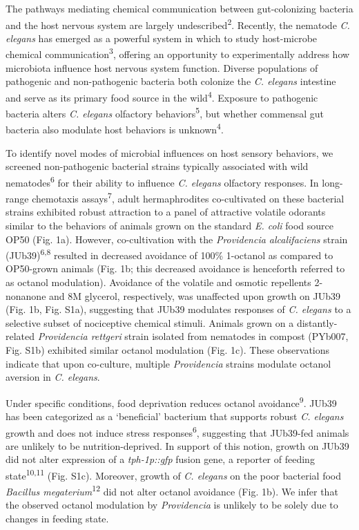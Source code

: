 \documentclass[11pt,]{article}
\begin{document}
The pathways mediating chemical communication between gut-colonizing
bacteria and the host nervous system are largely
undescribed\textsuperscript{2}. Recently, the nematode
\textit{C. elegans} has emerged as a powerful system in which to study
host-microbe chemical communication\textsuperscript{3}, offering an
opportunity to experimentally address how microbiota influence host
nervous system function. Diverse populations of pathogenic and
non-pathogenic bacteria both colonize the \emph{C. elegans} intestine
and serve as its primary food source in the wild\textsuperscript{4}.
Exposure to pathogenic bacteria alters \textit{C. elegans} olfactory
behaviors\textsuperscript{5}, but whether commensal gut bacteria also
modulate host behaviors is unknown\textsuperscript{4}.

To identify novel modes of microbial influences on host sensory
behaviors, we screened non-pathogenic bacterial strains typically
associated with wild nematodes\textsuperscript{6} for their ability to
influence \textit{C. elegans} olfactory responses. In long-range
chemotaxis assays\textsuperscript{7}, adult hermaphrodites co-cultivated
on these bacterial strains exhibited robust attraction to a panel of
attractive volatile odorants similar to the behaviors of animals grown
on the standard \textit{E. coli} food source OP50 (Fig. 1a). However,
co-cultivation with the \textit{Providencia alcalifaciens} strain
(JUb39)\textsuperscript{6,8} resulted in decreased avoidance of 100\%
1-octanol as compared to OP50-grown animals (Fig. 1b; this decreased
avoidance is henceforth referred to as octanol modulation). Avoidance of
the volatile and osmotic repellents 2-nonanone and 8M glycerol,
respectively, was unaffected upon growth on JUb39 (Fig. 1b, Fig. S1a),
suggesting that JUb39 modulates responses of \textit{C. elegans} to a
selective subset of nociceptive chemical stimuli. Animals grown on a
distantly-related \textit{Providencia rettgeri} strain isolated from
nematodes in compost (PYb007, Fig. S1b) exhibited similar octanol
modulation (Fig. 1c). These observations indicate that upon co-culture,
multiple \textit{Providencia} strains modulate octanol aversion in
\textit{C. elegans}.

Under specific conditions, food deprivation reduces octanol
avoidance\textsuperscript{9}. JUb39 has been categorized as a
`beneficial' bacterium that supports robust \textit{C. elegans} growth
and does not induce stress responses\textsuperscript{6}, suggesting that
JUb39-fed animals are unlikely to be nutrition-deprived. In support of
this notion, growth on JUb39 did not alter expression of a
\emph{tph-1p::gfp} fusion gene, a reporter of feeding
state\textsuperscript{10,11} (Fig. S1c). Moreover, growth of
\textit{C. elegans} on the poor bacterial food \emph{Bacillus
megaterium}\textsuperscript{12} did not alter octanol avoidance (Fig.
1b). We infer that the observed octanol modulation by
\textit{Providencia} is unlikely to be solely due to changes in feeding
state.
\end{document}
